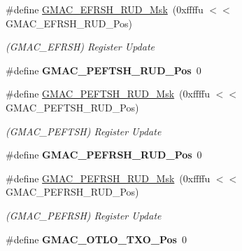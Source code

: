 \begin{DoxyCompactItemize}
\#define \mbox{\hyperlink{group__SAME70__GMAC_ga2b91b72e0bfe89afa1c3144bf5a6959a}{G\+M\+A\+C\+\_\+\+E\+F\+R\+S\+H\+\_\+\+R\+U\+D\+\_\+\+Msk}}~(0xffffu $<$$<$ G\+M\+A\+C\+\_\+\+E\+F\+R\+S\+H\+\_\+\+R\+U\+D\+\_\+\+Pos)
\begin{DoxyCompactList}\small\item\em (G\+M\+A\+C\+\_\+\+E\+F\+R\+SH) Register Update \end{DoxyCompactList}\item 
\mbox{\label{group__SAME70__GMAC_ga3e5721b1400560d0b079ff48d76c7712}} 
\#define {\bfseries G\+M\+A\+C\+\_\+\+P\+E\+F\+T\+S\+H\+\_\+\+R\+U\+D\+\_\+\+Pos}~0
\item 
\mbox{\label{group__SAME70__GMAC_ga4e9f164a14617a3fc6c2b968d3aa92a9}} 
\#define \mbox{\hyperlink{group__SAME70__GMAC_ga4e9f164a14617a3fc6c2b968d3aa92a9}{G\+M\+A\+C\+\_\+\+P\+E\+F\+T\+S\+H\+\_\+\+R\+U\+D\+\_\+\+Msk}}~(0xffffu $<$$<$ G\+M\+A\+C\+\_\+\+P\+E\+F\+T\+S\+H\+\_\+\+R\+U\+D\+\_\+\+Pos)
\begin{DoxyCompactList}\small\item\em (G\+M\+A\+C\+\_\+\+P\+E\+F\+T\+SH) Register Update \end{DoxyCompactList}\item 
\mbox{\label{group__SAME70__GMAC_ga0b653a631aad2e25afda4a459eabd681}} 
\#define {\bfseries G\+M\+A\+C\+\_\+\+P\+E\+F\+R\+S\+H\+\_\+\+R\+U\+D\+\_\+\+Pos}~0
\item 
\mbox{\label{group__SAME70__GMAC_ga84b058029b46048368f182fadfbedba2}} 
\#define \mbox{\hyperlink{group__SAME70__GMAC_ga84b058029b46048368f182fadfbedba2}{G\+M\+A\+C\+\_\+\+P\+E\+F\+R\+S\+H\+\_\+\+R\+U\+D\+\_\+\+Msk}}~(0xffffu $<$$<$ G\+M\+A\+C\+\_\+\+P\+E\+F\+R\+S\+H\+\_\+\+R\+U\+D\+\_\+\+Pos)
\begin{DoxyCompactList}\small\item\em (G\+M\+A\+C\+\_\+\+P\+E\+F\+R\+SH) Register Update \end{DoxyCompactList}\item 
\mbox{\label{group__SAME70__GMAC_ga812f04d83bf0603ea27945378003cbb0}} 
\#define {\bfseries G\+M\+A\+C\+\_\+\+O\+T\+L\+O\+\_\+\+T\+X\+O\+\_\+\+Pos}~0
\item 
\mbox{\label{group__SAME70__GMAC_gab6586cd8d51695f8973d98ccd8dcacf6}} 
$$
\end{DoxyCompactItemize}
